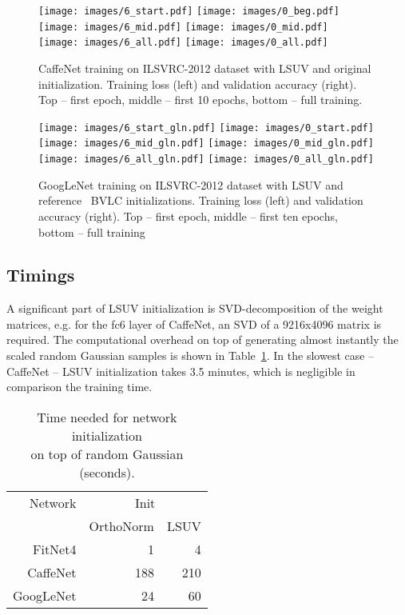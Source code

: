 \documentclass{article} \clearpage{}\usepackage{iclr2016_conference,times}
\begin{document}
\begin{figure}
 \centering
\texttt{[image: images/6\_start.pdf]}
\texttt{[image: images/0\_beg.pdf]}\\
\texttt{[image: images/6\_mid.pdf]}
\texttt{[image: images/0\_mid.pdf]}\\
\texttt{[image: images/6\_all.pdf]}
\texttt{[image: images/0\_all.pdf]}\\
\caption{CaffeNet training on ILSVRC-2012 dataset with LSUV and original~\cite{AlexNet2012} initialization. Training loss (left) and validation accuracy (right). Top -- first epoch, middle -- first 10 epochs, bottom -- full training.}
\label{fig:caffenet-training}
\end{figure}

\begin{figure}
 \centering
\texttt{[image: images/6\_start\_gln.pdf]}
\texttt{[image: images/0\_start.pdf]}\\
\texttt{[image: images/6\_mid\_gln.pdf]}
\texttt{[image: images/0\_mid\_gln.pdf]}\\
\texttt{[image: images/6\_all\_gln.pdf]}
\texttt{[image: images/0\_all\_gln.pdf]}\\
\caption{GoogLeNet training on ILSVRC-2012 dataset with LSUV and reference~\cite{jia2014caffe} BVLC initializations. Training loss (left) and validation accuracy (right).  Top -- first epoch, middle -- first ten epochs, bottom -- full training}
\label{fig:googlenet-training}
\end{figure}

\subsection{Timings}
\label{timings}
A significant part of LSUV initialization is SVD-decomposition of the weight matrices, e.g. for the fc6 layer of CaffeNet, an SVD of a 9216x4096 matrix is required. The computational overhead on top of generating almost instantly the scaled random Gaussian samples is shown in Table~\ref{tab:timings}. In the slowest case -- CaffeNet -- LSUV initialization takes 3.5 minutes, which is negligible in comparison the training time. 
\begin{table}[htb]
\caption{Time needed for network initialization \\ on top of random Gaussian (seconds).}
\label{tab:timings}
\centering
\begin{tabular}{r|rr|}
\hline
Network & \multicolumn{2}{c|}{Init}\\
& OrthoNorm & LSUV\\
\hline
FitNet4 & 1 & 4 \\
CaffeNet & 188 & 210 \\
GoogLeNet & 24 & 60 \\
\hline
\end{tabular}
\end{table}
\end{document}
